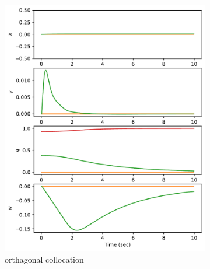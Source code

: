 \documentclass[]{article}
\begin{document}
\begin{figure}[H]
	\centering
	\begin{subfigure}[b]{0.3\textwidth}
		\centering
		\includegraphics[width=\textwidth]{state45dz1.pdf}
		\caption{orthagonal collocation}
	\end{subfigure}%
	\begin{subfigure}[b]{0.3\textwidth}
		\centering

\end{subfigure}
\end{figure}
\end{document}

